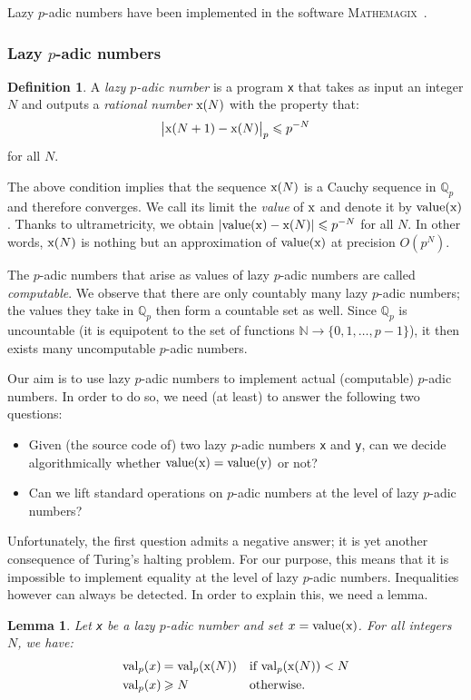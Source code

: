 \documentclass[11pt]{article}
\numberwithin{equation}{section}
\numberwithin{figure}{section}
\renewcommand{\leq}{\leqslant}
\renewcommand{\geq}{\geqslant}
\newtheorem{lem}[theo]{Lemma}
\theoremstyle{definition}
\newtheorem{deftn}[theo]{Definition}
\newcommand{\N}{\mathbb N}
\newcommand{\Q}{\mathbb Q}
\newcommand{\Qp}{\Q_p}
\newcommand{\val}{\text{\rm val}}
\newcommand{\Value}{\text{\rm value}}
\newcommand{\ttx}{\texttt{\rm x}\xspace}
\newcommand{\tty}{\texttt{\rm y}\xspace}
\newcommand{\mathemagix}{\textsc{Mathemagix}~\cite{mathemagix}\xspace}
\begin{document}
Lazy $p$-adic numbers have been implemented in the software \mathemagix.

\subsubsection{Lazy $p$-adic numbers}
\label{sssec:lazynaive}

\begin{deftn}
A \emph{lazy $p$-adic number} is a program \ttx that takes as
input an integer $N$ and outputs a \emph{rational number} $\ttx
(N)$ with the property that:
$$\big|\ttx(N+1) - \ttx(N)\big|_p \leq p^{-N}$$
for all $N$.
\end{deftn}

The above condition implies that the sequence $\ttx(N)$ is a Cauchy 
sequence in $\Qp$ and therefore converges. We call its limit the 
\emph{value} of $\ttx$ and denote it by $\Value(\ttx)$. Thanks to 
ultrametricity, we obtain $|\Value(\ttx) - \ttx(N)| \leq p^{-N}$ for all 
$N$. In other words, $\ttx(N)$ is nothing but an approximation of 
$\Value(\ttx)$ at precision $O(p^N)$.

The $p$-adic numbers that arise as values of lazy $p$-adic numbers
are called \emph{computable}.
We observe that there are only countably many lazy $p$-adic numbers;
the values they take in $\Qp$ then form a countable set as well. Since $\Qp$
is uncountable (it is equipotent to the set of functions $\N \to
\{0, 1, \ldots, p{-}1\}$), it then exists many uncomputable $p$-adic
numbers.

Our aim is to use lazy $p$-adic numbers to implement actual (computable) 
$p$-adic numbers. In order to do so, we need (at least) to answer the 
following two questions:
\begin{itemize}
\renewcommand{\itemsep}{0pt}
\item Given (the source code of) two lazy $p$-adic numbers \ttx and 
\tty, can we decide algorithmically whether $\Value(\ttx) = \Value(\tty)$
or not?
\item Can we lift standard operations on $p$-adic numbers at the level
of lazy $p$-adic numbers?
\end{itemize}
Unfortunately, the first question admits a negative answer; it is yet
another consequence of Turing's halting problem. For our purpose, this 
means that it is impossible to implement equality at the level of
lazy $p$-adic numbers. Inequalities however can always be detected. In
order to explain this, we need a lemma.

\begin{lem}
\label{lem:vallazy}
Let \ttx be a lazy $p$-adic number and set $x = \Value(\ttx)$.
For all integers $N$, we have:
$$\begin{array}{r@{\hspace{0.5ex}}ll}
\val_p(x) & = \val_p(\ttx(N)) & \text{if } \val_p(\ttx(N)) < N \smallskip \\
\val_p(x) & \geq N & \text{otherwise.}
\end{array}$$
\end{lem}
\end{document}
